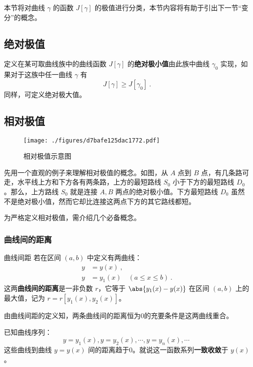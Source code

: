 

本节将对曲线 $\gamma$ 的函数 $J[\gamma]$ 的极值进行分类，本节内容将有助于引出下一节“变分”的概念。

\subsection{绝对极值}
定义在某可取曲线族中的曲线函数 $J[\gamma]$ 的\textbf{绝对极小值}由此族中曲线 $\gamma_0$ 实现，如果对于这族中任一曲线 $\gamma$ 有
\begin{equation}
J[\gamma]\geq J[\gamma_0]~.
\end{equation}
同样，可定义绝对极大值。
\subsection{相对极值}\label{sub_AbPol_1}
\begin{figure}[ht]
\centering
\texttt{[image: ./figures/d7bafe125dac1772.pdf]}
\caption{相对极值示意图} \label{fig_AbPol_1}
\end{figure}

先用一个直观的例子来理解相对极值的概念。如图，从 $A$ 点到 $B$ 点，有几条路可走，水平线上方和下方各有两条路，上方的最短路线 $S_0$ 小于下方的最短路线 $D_0$ 。那么，上方路线 $S_0$ 就是连接 $A,B$ 两点的绝对极小值。下方最短路线 $D_0$ 虽然不是绝对极小值，然而它却比连接这两点下方的其它路线都短。 

为严格定义相对极值，需介绍几个必备概念。
\subsubsection{曲线间的距离}
\begin{definition}{曲线间距}
若在区间 $(a,b)$ 中定义有两曲线：
\begin{equation}
\begin{aligned}
y&=y(x)~,\\
y&=y_1(x)\quad(a\leq x\leq b)~.
\end{aligned}
\end{equation}
这两\textbf{曲线间的距离}是一非负数 $r$，它等于 $\abs{y_1(x)-y(x)}$ 在区间 $(a,b)$ 上的最大值，记为 $r=r[y_1(x),y_2(x)]$。
\end{definition}
由曲线间距的定义知，两条曲线间的距离恒为0的充要条件是这两曲线重合。

已知曲线序列：
\begin{equation}
y=y_1(x),y=y_2(x),\cdots,y=y_n(x),\cdots~
\end{equation}
这些曲线到曲线 $y=y(x)$ 间的距离趋于0。就说这一函数系列\textbf{一致收敛}于 $y(x)$。

